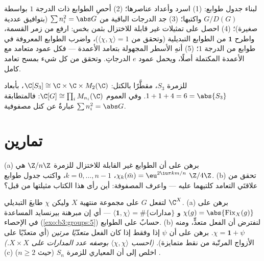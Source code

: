 \begin{method}\label{met:b3:representations:table}
لبناء جدول طوابع: (1) اسرد  وأعداد عناصرها؛ (2)
أحصِ الطوابع ذات الدرجة $1$ بواسطة $G/D(G)$ واكتبها؛ (3) جد
الدرجات الباقية من $\sum n_i^2 = \abs G$ (بتوافيق عددية صغيرة)؛ (4) احصل على
تمثيلات غير قابلة للاختزال بثمن بخس: ارفع من زمر القسمة، واطرح
$\mathbf 1$ من الطوابع التبديلية (وتحقق من $\langle\chi,\chi\rangle = 1$)، واضرب
الطوابع المعروفة في طوابع من الدرجة $1$؛ (5) أنهِ الأسطر المجهولة
بتعامد الأعمدة --- فكل عمود متعامد مع الأعمدة المكتملة أصلًا،
ويحمل عمود $e$ الدرجاتِ. وتحقق من كل شيء بمسح تعامد كامل.
\end{method}

\begin{omfigure}

{\small {} للزمرة $S_3$، مقطَّرًا بالكتل: $\C[S_3] \cong \C \times \C \times M_2(\C)$،
بأبعاد $1 + 1 +
4 = 6 = \abs{S_3}$. وفي العموم $\C[G] \cong \prod_i
M_{n_i}(\C)$: فالمتطابقة $\sum n_i^2 = \abs G$ عبارةٌ
عن كتل مصفوفية.}
\end{omfigure}

\section{تمارين}

\begin{exercise}[$\star$]\label{exo:b3:representations:1}
(a) برهن على أن الطوابع غير القابلة للاختزال للزمرة $\Z/n\Z$ هي
$\chi_k(\bar m) = \eu^{2\iu\pi km/n}$، $k = 0, \dots, n-1$، واكتب جدول طوابع $\Z/4\Z$.
(b) تحقق من علاقتَي التعامد كلتيهما عليه --- واعرف المصفوفة: أين
رأى هذا الكتاب مثيلتها من قبل؟
\end{exercise}

\begin{exercise}[$\star$]\label{exo:b3:representations:2}
لتفعل $G$ على مجموعة منتهية $X$ وليكن $\chi$ طابعَ 
التبديلي $\C^X$.
(a) برهن على $\chi(g) = \abs{\operatorname{Fix}_X(g)}$ و $\langle \mathbf 1, \chi\rangle = \#\{\text{مدارات}\}$ --- أي إن مبرهنة بيرنسايد
المساعدة في الإحصاء (\cref{exo:b3:groups:5}) حسابٌ على الطوابع.
(b) لنفترض أن الفعل متعدٍّ، ومنه $\chi = \mathbf 1 +
\psi$. برهن على أن $\psi$  إذا وفقط إذا كان الفعل \emph{متعدّيًا مرتين} (أي
متعدّيًا على الأزواج المرتّبة من نقط متمايزة). \emph{(احسب $\langle\chi,\chi\rangle$
بوصفه عدد المدارات على $X \times X$.)}
(c) اخلص إلى أن  المعياري للزمرة $S_n$ (حيث $n \geq
2$) .
\end{exercise}

